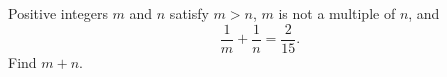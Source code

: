 Positive integers $m$ and $n$ satisfy $m>n$, $m$ is not a multiple of $n$, and
\[
\dfrac{1}{m}+\dfrac{1}{n}=\dfrac{2}{15}.
\]
Find $m+n$.
